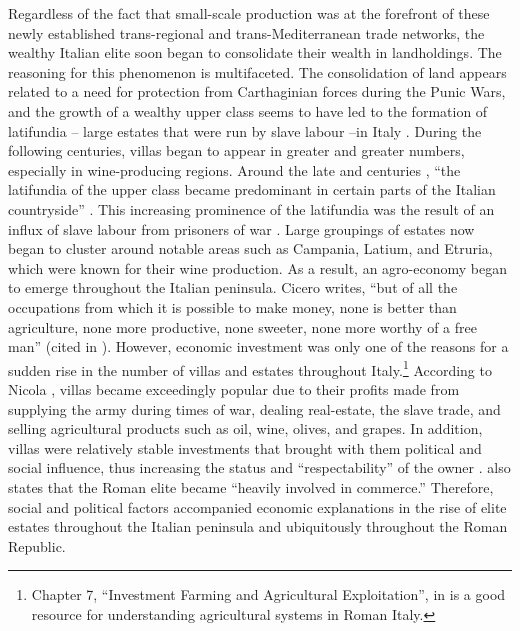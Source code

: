 Regardless of the fact that small-scale production was at the forefront of these newly established trans-regional and trans-Mediterranean trade networks, the wealthy Italian elite soon began to consolidate their wealth in landholdings. The reasoning for this phenomenon is multifaceted. The consolidation of land appears related to a need for protection from Carthaginian forces during the Punic Wars, and the growth of a wealthy upper class seems to have led to the formation of latifundia – large estates that were run by slave labour –in Italy \parencite[98--106]{Potter_1990}. During the following centuries, villas began to appear in greater and greater numbers, especially in wine-producing regions. Around the late  and  centuries \BC, “the latifundia of the upper class became predominant in certain parts of the Italian countryside” \parencite[12]{Moore_1995}. This increasing prominence of the latifundia was the result of an influx of slave labour from prisoners of war \parencite[178--179]{Kay_2014}.  Large groupings of estates now began to cluster around notable areas such as Campania, Latium, and Etruria, which were known for their wine production. As a result, an agro-economy began to emerge throughout the Italian peninsula. Cicero writes, “but of all the occupations from which it is possible to make money, none is better than agriculture, none more productive, none sweeter, none more worthy of a free man” (cited in \textcite[133]{Kay_2014}). However, economic investment was only one of the reasons for a sudden rise in the number of villas and estates throughout Italy.\footnote{Chapter 7, “Investment Farming and Agricultural Exploitation”, in \textcite{Kay_2014} is a good resource for understanding agricultural systems in Roman Italy.} According to Nicola \textcite[29]{Terrenato_2001}, villas became exceedingly popular due to their profits made from supplying the army during times of war, dealing real-estate, the slave trade, and selling agricultural products such as oil, wine, olives, and grapes. In addition, villas were relatively stable investments that brought with them political and social influence, thus increasing the status and “respectability” of the owner \parencite[29]{Terrenato_2001}. \textcite[119]{Storey_2004} also states that the Roman elite became “heavily involved in commerce.” Therefore, social and political factors accompanied economic explanations in the rise of elite estates throughout the Italian peninsula and ubiquitously throughout the Roman Republic.


